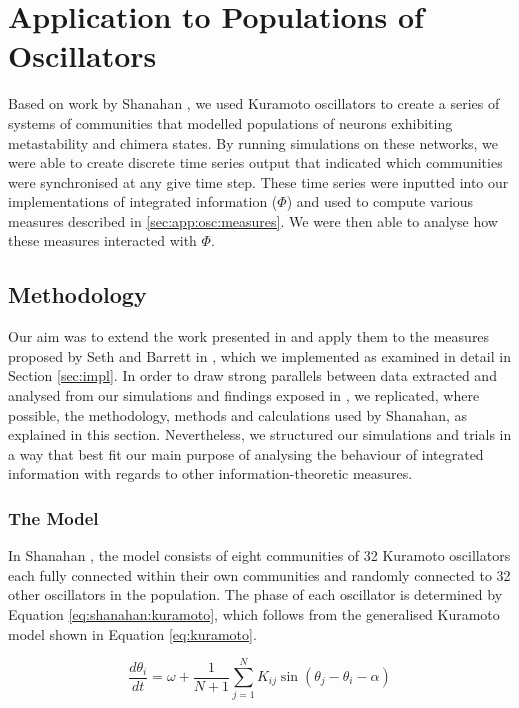 \documentclass[a4paper,11pt]{article}
\begin{document}
\section{Application to Populations of Oscillators}
\label{MSUKO}

Based on work by Shanahan \cite{Shanahan2010}, we used Kuramoto oscillators to create a series of systems of communities that modelled populations of neurons exhibiting metastability and chimera states. By running simulations on these networks, we were able to create discrete time series output that indicated which communities were synchronised at any give time step. These time series were inputted into our implementations of integrated information ($\Phi$) and used to compute various measures described in \ref{sec:app:osc:measures}. We were then able to analyse how these measures interacted with $\Phi$.

\subsection{Methodology}
\label{sec:osc:methods}
Our aim was to extend the work presented in \cite{Shanahan2010} and apply them to the measures proposed by Seth and Barrett in \cite{Barrett2011}, which we implemented as examined in detail in Section \ref{sec:impl}. In order to draw strong parallels between data extracted and analysed from our simulations and findings exposed in \cite{Shanahan2010}, we replicated, where possible, the methodology, methods and calculations used by Shanahan, as explained in this section. Nevertheless, we structured our simulations and trials in a way that best fit our main purpose of analysing the behaviour of integrated information with regards to other information-theoretic measures.

\subsubsection{The Model}
\label{sec:osc:mod}

In Shanahan \cite{Shanahan2010}, the model consists of eight communities of 32 Kuramoto oscillators each fully connected within their own communities and randomly connected to 32 other oscillators in the population. The phase of each oscillator is determined by Equation \ref{eq:shanahan:kuramoto}, which follows from the generalised Kuramoto model shown in Equation \ref{eq:kuramoto}. 

\begin{equation} \label{eq:shanahan:kuramoto}
\frac{d\theta_i}{dt} = \omega + \frac{1}{N + 1} \sum_{j=1}^{N} K_{ij} \sin(\theta_j - \theta_i - \alpha)
\end{equation}
\end{document}
